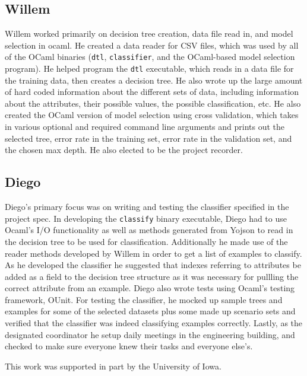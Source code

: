 \documentclass[screen, authorversion, nonacm, sigconf]{acmart}
\begin{document}
\subsection{Willem}

Willem worked primarily on decision tree creation, data file read in, and model selection in ocaml. He created a data reader for CSV files, which was used by all of the OCaml binaries (\texttt{dtl}, \texttt{classifier}, and the OCaml-based model selection program). He helped program the \texttt{dtl} executable, which reads in a data file for the training data, then creates a decision tree. He also wrote up the large amount of hard coded information about the different sets of data, including information about the attributes, their possible values, the possible classification, etc. He also created the OCaml version of model selection using cross validation, which takes in various optional and required command line arguments and prints out the selected tree, error rate in the training set, error rate in the validation set, and the chosen max depth. He also elected to be the project recorder.

\subsection{Diego}

Diego's primary focus was on writing and testing the classifier specified in the project spec. In developing the \texttt{classify} binary executable, Diego had to use Ocaml's I/O functionality as well as methods generated from Yojson to read in the decision tree to be used for classification. Additionally he made use of the reader methods developed by Willem in order to get a list of examples to classify. As he developed the classifier he suggested that indexes referring to attributes be added as a field to the decision tree structure as it was necessary for pullling the correct attribute from an example. Diego also wrote tests using Ocaml's testing framework, OUnit. For testing the classifier, he mocked up sample trees and examples for some of the selected datasets plus some made up scenario sets and verified that the classifier was indeed classifying examples correctly. Lastly, as the designated coordinator he setup daily meetings in the engineering building, and checked to make sure everyone knew their tasks and everyone else's.

\begin{acks}
This work was supported in part by the University of Iowa.
\end{acks}
\end{document}
